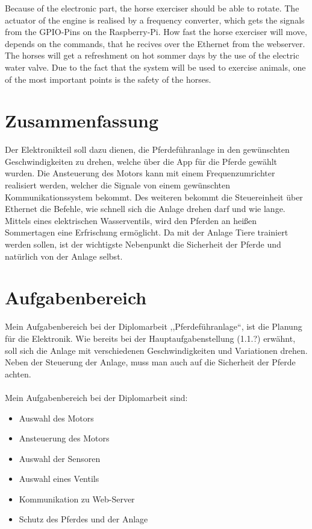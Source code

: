 \documentclass[12pt]{scrreprt} %
\begin{document}
Because of the electronic part, the horse exerciser should be able to rotate. 
The actuator of the engine is realised by a frequency converter, which gets the signals from the GPIO-Pins on the Raspberry-Pi.
How fast the horse exerciser will move, depends on the commands, that he recives over the Ethernet from the webserver.
The horses will get a refreshment on hot sommer days by the use of the electric water valve.
Due to the fact that the system will be used to exercise animals, one of the most important points is the safety of the horses.

\section{Zusammenfassung}
\label{sec:zusammenfassung}

Der Elektronikteil soll dazu dienen, die Pferdeführanlage in den gewünschten Geschwindigkeiten zu drehen, welche über die App für die Pferde gewählt wurden. 
Die Ansteuerung des Motors kann mit einem Frequenzumrichter realisiert werden, 
welcher die Signale von einem gewünschten Kommunikationssystem bekommt.
Des weiteren bekommt die Steuereinheit über Ethernet die Befehle, wie schnell sich die Anlage drehen darf und wie lange. 
Mittels eines elektrischen Wasserventils, wird den Pferden an heißen Sommertagen eine Erfrischung ermöglicht. 
Da mit der Anlage Tiere trainiert werden sollen, ist der wichtigste Nebenpunkt die Sicherheit der Pferde und natürlich von der Anlage selbst.
\newpage

\section{Aufgabenbereich}
\label{sec:aufgabenbereich}

Mein Aufgabenbereich bei der Diplomarbeit ,,Pferdeführanlage“, ist die Planung für die Elektronik. Wie bereits bei der Hauptaufgabenstellung (1.1.?) erwähnt, 
soll sich die Anlage mit verschiedenen Geschwindigkeiten und Variationen drehen.  Neben der Steuerung der Anlage, muss man auch auf die Sicherheit der Pferde achten.
\\
\\
Mein Aufgabenbereich bei der Diplomarbeit sind:

\begin{itemize}
\item Auswahl des Motors
\item Ansteuerung des Motors
\item Auswahl der Sensoren
\item Auswahl eines Ventils
\item Kommunikation zu Web-Server
\item Schutz des Pferdes und der Anlage
\end{itemize}
\newpage
\end{document}
